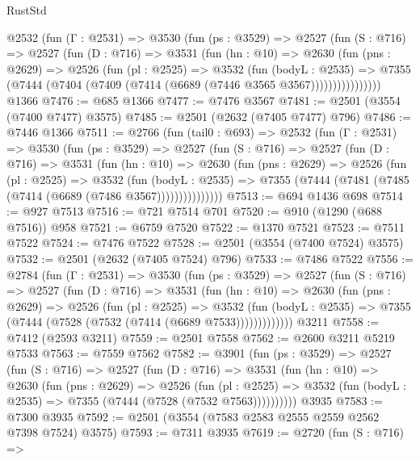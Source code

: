 \begin{lexlean}{RustStd}
\begin{coremodule}
      @2532
        (fun (Γ : @2531) =>
        @3530
          (fun (ps : @3529) =>
          @2527
            (fun (S : @716) =>
            @2527
              (fun (D : @716) =>
              @3531
                (fun (hn : @10) =>
                @2630
                  (fun (pns : @2629) =>
                  @2526
                    (fun (pl : @2525) =>
                    @3532
                      (fun (bodyL : @2535) =>
                      @7355 (@7444 (@7404 (@7409 (@7414 (@6689 (@7446 @3565 @3567))))))))))))))))
    @1366
@7476 := @685 @1366
@7477 := @7476 @3567
@7481 := @2501 (@3554 (@7400 @7477) @3575)
@7485 := @2501 (@2632 (@7405 @7477) @796)
@7486 := @7446 @1366
@7511 := @2766
    (fun (tail0 : @693) =>
    @2532
      (fun (Γ : @2531) =>
      @3530
        (fun (ps : @3529) =>
        @2527
          (fun (S : @716) =>
          @2527
            (fun (D : @716) =>
            @3531
              (fun (hn : @10) =>
              @2630
                (fun (pns : @2629) =>
                @2526
                  (fun (pl : @2525) =>
                  @3532
                    (fun (bodyL : @2535) =>
                    @7355 (@7444 (@7481 (@7485 (@7414 (@6689 (@7486 @3567)))))))))))))))
@7513 := @694 @1436 @698
@7514 := @927 @7513
@7516 := @721 @7514 @701
@7520 := @910 (@1290 (@688 @7516)) @958
@7521 := @6759 @7520
@7522 := @1370 @7521
@7523 := @7511 @7522
@7524 := @7476 @7522
@7528 := @2501 (@3554 (@7400 @7524) @3575)
@7532 := @2501 (@2632 (@7405 @7524) @796)
@7533 := @7486 @7522
@7556 := @2784
    (fun (Γ : @2531) =>
    @3530
      (fun (ps : @3529) =>
      @2527
        (fun (S : @716) =>
        @2527
          (fun (D : @716) =>
          @3531
            (fun (hn : @10) =>
            @2630
              (fun (pns : @2629) =>
              @2526
                (fun (pl : @2525) =>
                @3532
                  (fun (bodyL : @2535) =>
                  @7355 (@7444 (@7528 (@7532 (@7414 (@6689 @7533)))))))))))))
    @3211
@7558 := @7412 (@2593 @3211)
@7559 := @2501 @7558
@7562 := @2600 @3211 @5219 @7533
@7563 := @7559 @7562
@7582 := @3901
    (fun (ps : @3529) =>
    @2527
      (fun (S : @716) =>
      @2527
        (fun (D : @716) =>
        @3531
          (fun (hn : @10) =>
          @2630
            (fun (pns : @2629) =>
            @2526
              (fun (pl : @2525) =>
              @3532 (fun (bodyL : @2535) => @7355 (@7444 (@7528 (@7532 @7563))))))))))
    @3935
@7583 := @7300 @3935
@7592 := @2501 (@3554 (@7583 @2583 @2555 @2559 @2562 @7398 @7524) @3575)
@7593 := @7311 @3935
@7619 := @2720
    (fun (S : @716) =>

\end{coremodule}
\end{lexlean}
